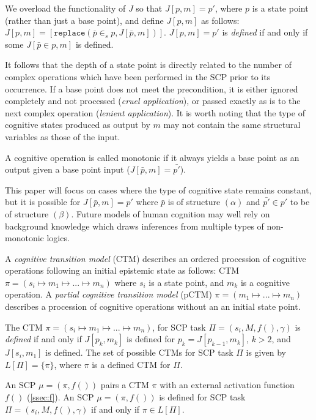We overload the functionality of $J$ so that $J[p,m]=p'$, where $p$ is a state point (rather than just a base point), and define $J[p,m]$ as follows: $J[p,m]=[ \texttt{replace}(\bar{p} \in_s p,J[\bar{p},m])]$. $J[p,m]=p'$ is \textit{defined} if and only if some $J[\bar{p} \in p,m]$ is defined.

It follows that the depth of a state point is directly related to the number of complex operations which have been performed in the SCP prior to its occurrence. If a base point does not meet the precondition, it is either ignored completely and not processed (\textit{cruel application}), or passed exactly as is to the next complex operation (\textit{lenient application}). It is worth noting that the type of cognitive states produced as output by $m$ may not contain the same structural variables as those of the input.
 
A cognitive operation is called monotonic if it always yields a base point as an output given a base point input ($J[\bar{p},m]=\bar{p'}$).

This paper will focus on cases where the type of cognitive state remains constant, but it is possible for $J[\bar{p},m]=p'$ where $\bar{p}$ is of structure $(\alpha)$ and $\bar{p'}\in p'$ to be of structure $(\beta)$. Future models of human cognition may well rely on background knowledge which draws inferences from multiple types of non-monotonic logics.

A \textit{cognitive transition model} (CTM) describes an ordered procession of cognitive operations following an initial epistemic state as follows: CTM $\pi=(s_i\longmapsto m_1\longmapsto ...\longmapsto m_n)$ where $s_i$ is a state point, and $m_k$ is a cognitive operation. A \textit{partial cognitive transition model} (pCTM) $\pi=(m_1\longmapsto ...\longmapsto m_n)$ describes a procession of cognitive operations without an an initial state point.

The CTM $\pi = (s_i\longmapsto m_1 \longmapsto ...\longmapsto m_n)$, for SCP task $\Pi=(s_i, M, f(), \gamma)$ is \textit{defined} if and only if $J[p_k,m_k]$ is defined for $p_k = J[p_{k-1},m_k]$, $k>2$, and $J[s_i,m_1]$ is defined. The set of possible CTMs for SCP task $\Pi$ is given by $L[\Pi]=\{\pi\}$, where $\pi$ is a defined CTM for $\Pi$.

An SCP $\mu=(\pi,f())$  pairs a CTM $\pi$ with an external activation function $f()$ (\ref{ssec:f}). An SCP $\mu=(\pi,f())$ is defined for SCP task $\Pi=(s_i, M, f(), \gamma)$ if and only if $\pi \in L[\Pi]$.




